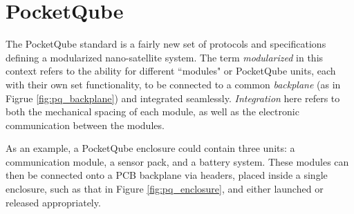 \graphicspath{{./figures}}

\section{PocketQube}

The PocketQube standard is a fairly new set of protocols and specifications defining a modularized nano-satellite system. The term \textit{modularized} in this context refers to the ability for different ``modules" or PocketQube units, each with their own set functionality, to be connected to a common \textit{backplane} (as in Figrue \ref{fig:pq_backplane}) and integrated seamlessly. \textit{Integration} here refers to both the mechanical spacing of each module, as well as the electronic communication between the modules.

As an example, a PocketQube enclosure could contain three units: a communication module, a sensor pack, and a battery system. These modules can then be connected onto a PCB backplane via headers, placed inside a single enclosure, such as that in Figure \ref{fig:pq_enclosure}, and either launched or released appropriately.